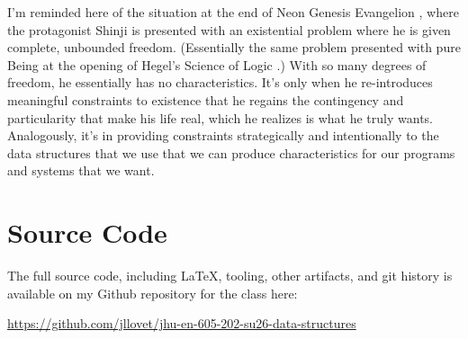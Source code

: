 \documentclass[10pt,letterpaper,final]{report}
\begin{document}
I'm reminded here of the situation at the end of Neon Genesis Evangelion \parencite{Anno1995NeonGenesisEvangelion}, where the protagonist Shinji is presented with an existential problem where he is given complete, unbounded freedom. (Essentially the same problem presented with pure Being at the opening of Hegel's Science of Logic \parencite{Miller2013HegelsScienceOfLogic}.) With so many degrees of freedom, he essentially has no characteristics. It's only when he re-introduces meaningful constraints to existence that he regains the contingency and particularity that make his life real, which he realizes is what he truly wants. Analogously, it's in providing constraints strategically and intentionally to the data structures that we use that we can produce characteristics for our programs and systems that we want.

\pagebreak

\section*{Source Code}
The full source code, including LaTeX, tooling, other artifacts, and git history is available on my Github repository for the class here:
\begin{center}
  \url{https://github.com/jllovet/jhu-en-605-202-su26-data-structures}
\end{center}

\printbibliography
\end{document}
